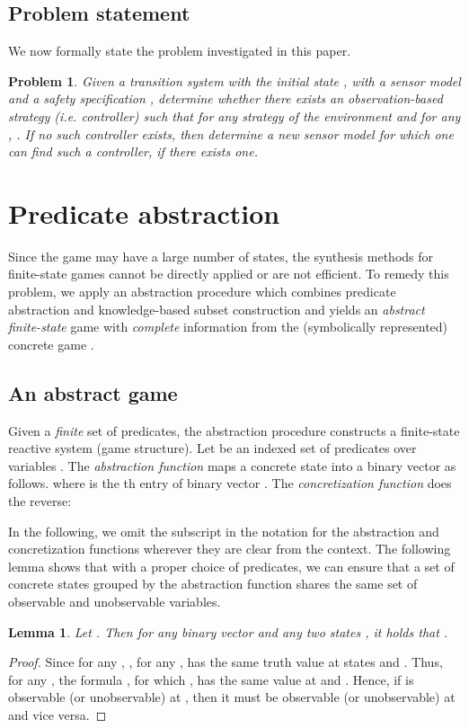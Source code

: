 \documentclass[letterpaper, 10 pt, conference]{ieeeconf}
\newtheorem{lemma}{Lemma}
\newtheorem{problem}{Problem}
\begin{document}
\subsection{Problem statement}
\noindent
We now formally state the problem investigated in this paper.
\begin{problem}
  Given a transition system  with the initial state , with a sensor model  and
  a safety specification , determine
  whether there exists an observation-based strategy (i.e. controller)
   such that for any strategy of the environment  and for
  any , . If no such controller exists, then determine a new
  sensor model for which one can find such a controller, if there
  exists one.
\end{problem}







\section{Predicate abstraction}

Since the game  may have a large number of states, the synthesis methods for finite-state games cannot be directly applied or are not efficient. To remedy this problem, we apply an abstraction procedure which combines predicate abstraction and knowledge-based
subset construction and yields an
\emph{abstract finite-state} game with \emph{complete} information 
from the (symbolically represented) concrete game .

\subsection{An abstract game}

Given a \emph{finite} set of predicates, the  abstraction procedure
constructs a finite-state reactive system (game structure).  
Let
 be an indexed set of
predicates over variables .  The \emph{abstraction function}
 maps
a concrete state into a binary vector as
follows. 
where  is the th entry of binary vector .  The  \emph{concretization function}  does the reverse:
 

In the following, we omit the subscript  in the notation
for the abstraction and concretization functions wherever they are
clear from the context.  The following lemma shows that with a proper
choice of predicates, we can ensure that a set of concrete states
grouped by the abstraction function shares the same set of observable
and unobservable variables.
\begin{lemma}
\label{lm1}
Let . Then for any binary vector  and any two states , it holds that .
\end{lemma}
\begin{proof}Since for any , , 
  for any ,  has the same truth value at states  and . Thus, for any , the formula
  , for which , has the same
  value at  and . Hence, if  is observable (or
  unobservable) at , then it must be observable (or unobservable)
  at  and vice versa. 
\end{proof}
\end{document}
